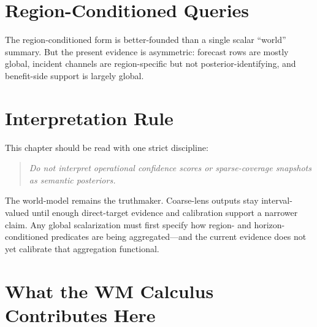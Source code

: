 \documentclass[11pt,openany]{report}
\begin{document}
\section{Region-Conditioned Queries}

The region-conditioned form is better-founded than a single
scalar ``world'' summary.  But the present evidence is
asymmetric: forecast rows are mostly global, incident channels
are region-specific but not posterior-identifying, and
benefit-side support is largely global.

\begin{table}[htbp]
\centering
\caption{Region-horizon surface.  Numeric hull columns are
global horizon-conditioned intervals; the ordering column records
assumption-driven directional claims only.}
\label{tab:ai-outcomes-region-horizon}
\end{table}


\section{Interpretation Rule}

This chapter should be read with one strict discipline:
\begin{quote}
\emph{Do not interpret operational confidence scores or
sparse-coverage snapshots as semantic posteriors.}
\end{quote}
The world-model remains the truthmaker.  Coarse-lens outputs
stay interval-valued until enough direct-target evidence and
calibration support a narrower claim.  Any global scalarization
must first specify how region- and horizon-conditioned predicates
are being aggregated---and the current evidence does not yet
calibrate that aggregation functional.


\section{What the WM Calculus Contributes Here}
\end{document}
